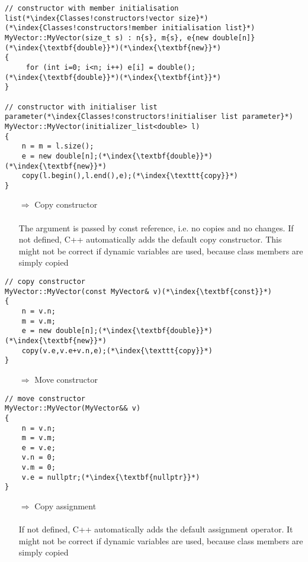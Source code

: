 \documentclass[10pt]{article}
\begin{document}
\begin{lstlisting}
// constructor with member initialisation list(*\index{Classes!constructors!vector size}*)(*\index{Classes!constructors!member initialisation list}*)
MyVector::MyVector(size_t s) : n{s}, m{s}, e{new double[n]}(*\index{\textbf{double}}*)(*\index{\textbf{new}}*)
{
     for (int i=0; i<n; i++) e[i] = double();(*\index{\textbf{double}}*)(*\index{\textbf{int}}*)
}

// constructor with initialiser list parameter(*\index{Classes!constructors!initialiser list parameter}*)
MyVector::MyVector(initializer_list<double> l)
{
    n = m = l.size();
    e = new double[n];(*\index{\textbf{double}}*)(*\index{\textbf{new}}*)
    copy(l.begin(),l.end(),e);(*\index{\texttt{copy}}*)
}
\end{lstlisting}
\begin{enumerate}
\item[$\Rightarrow$] Copy constructor\\ \\ The argument is passed by const reference, i.e. no copies and no changes. If not defined, C++ automatically adds the default copy
constructor. This might not be correct if dynamic variables are used,
because class members are simply copied
\end{enumerate}
\begin{lstlisting}
// copy constructor
MyVector::MyVector(const MyVector& v)(*\index{\textbf{const}}*)
{
    n = v.n;
    m = v.m;
    e = new double[n];(*\index{\textbf{double}}*)(*\index{\textbf{new}}*)
    copy(v.e,v.e+v.n,e);(*\index{\texttt{copy}}*)
}
\end{lstlisting}
\begin{enumerate}
\item[$\Rightarrow$] Move constructor
\end{enumerate}
\begin{lstlisting}
// move constructor
MyVector::MyVector(MyVector&& v)
{
    n = v.n;
    m = v.m;
    e = v.e;
    v.n = 0;
    v.m = 0;
    v.e = nullptr;(*\index{\textbf{nullptr}}*)
}
\end{lstlisting}
\begin{enumerate}
\item[$\Rightarrow$] Copy assignment\\ \\ If not defined, C++ automatically adds  the default assignment operator.
It might not be correct if dynamic variables are used,
because class members are simply copied
\end{enumerate}
\end{document}

